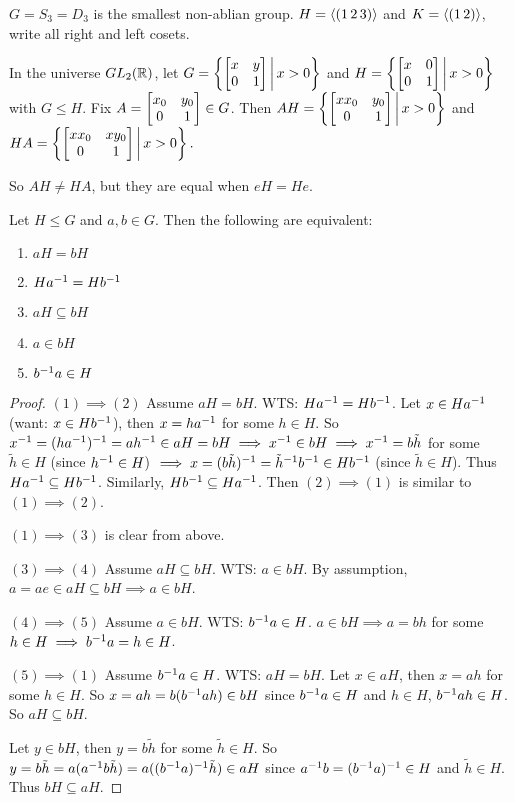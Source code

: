 \documentclass[]{article}
\begin{document}
\begin{example}
	$G = S_3 = D_3$ is the smallest non-ablian group. $H =\langle (1\,2\,3) \rangle$ and $K =\langle (1\,2) \rangle$, write all right and left cosets.
\end{example}
\begin{example}
	In the universe $GL_2(\mathbb{R})$, let $G = \left\{ \begin{bmatrix}x&y\\0&1\end{bmatrix} \, \middle| \, x>0 \right\}$ and $H = \left\{ \begin{bmatrix}x&0\\0&1\end{bmatrix} \, \middle| \, x>0 \right\}$ with $G\leq H$.
	Fix $A = \begin{bmatrix}x_0&y_0\\0&1\end{bmatrix}\in G$.
	Then
	$AH = \left\{ \begin{bmatrix}xx_0&y_0\\0&1\end{bmatrix} \, \middle| \, x>0 \right\}$ and $HA = \left\{ \begin{bmatrix}xx_0&xy_0\\0&1\end{bmatrix} \, \middle| \,  x>0 \right\}.$
	
	So $AH\neq HA$, but they are equal when $eH = He$.
\end{example}

\begin{lemma}
	 Let $H\leq G$ and $a,b\in G$. Then the following are equivalent:
	\begin{enumerate}
		\item $aH = bH$
		\item $Ha^{-1} = Hb^{-1}$
		\item $aH\subseteq bH$
		\item $a\in bH$
		\item $b^{-1} a\in H$
	\end{enumerate}
\end{lemma}
\begin{proof}
	$(1)\implies(2)$ Assume $aH = bH$. WTS: $Ha^{-1} = Hb^{-1}$.
	Let $x\in Ha^{-1}$ (want: $x\in Hb^{-1}$), then $x = ha^{-1}$ for some $h\in H$.
	So $x^{-1} = (ha^{-1})^{-1} = ah^{-1} \in aH=bH\implies x^{-1} \in bH\implies x^{-1} = b\tilde{h}$ for some $\tilde{h}\in H$ (since $h^{-1}\in H$) $\implies x = (b\tilde{h})^{-1} = \tilde{h}^{-1} b^{-1} \in Hb^{-1}$ (since $\tilde{h}\in H$).
	Thus $Ha^{-1}\subseteq Hb^{-1}$. Similarly, $Hb^{-1} \subseteq Ha^{-1}$.
	Then $(2)\implies(1)$ is similar to $(1)\implies(2)$.

	$(1)\implies(3)$ is clear from above.

	$(3)\implies(4)$ Assume $aH\subseteq bH$. WTS: $a\in bH$. By assumption, $a = ae \in aH\subseteq bH \implies a\in bH$.
	
	$(4)\implies(5)$ Assume $a\in bH$. WTS: $b^{-1} a\in H$.
	$a\in bH\implies a = bh$ for some $h\in H \implies b^{-1} a = h\in H$.

	$(5)\implies(1)$ Assume $b^{-1} a\in H$. WTS: $aH = bH$.
	Let $x\in aH$, then $x = ah$ for some $h\in H$. So $x = ah = b(b^{-1} ah)\in bH$ since $b^{-1} a\in H$ and $h\in H$, $b^{-1} ah\in H$.
	So $aH\subseteq bH$.

	Let $y\in bH$, then $y = b\tilde{h}$ for some $\tilde{h}\in H$. So $y= b\tilde{h} = a(a^{-1} b\tilde{h}) = a((b^{-1} a)^{-1} \tilde{h})\in aH$ since $a^{-1} b = (b^{-1} a)^{-1}\in H$ and $\tilde{h}\in H$. Thus $bH\subseteq aH$.
\end{proof}
\end{document}
